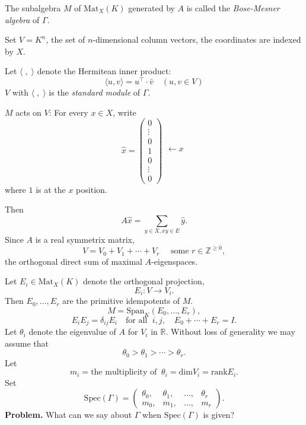 \documentclass[
]{book}
\theoremstyle{definition}
\theoremstyle{definition}
\theoremstyle{definition}
\theoremstyle{definition}
\theoremstyle{remark}
\begin{document}
The subalgebra \(M\) of \(\mathrm{Mat}_X(K)\) generated by \(A\) is called the \emph{Bose-Mesner algebra} of \(\Gamma\).

Set \(V = K^n\), the set of \(n\)-dimensional column vectors, the coordinates are indexed by \(X\).

Let \(\langle\; , \;\rangle\) denote the Hermitean inner product:
\[\langle u, v\rangle = u^\top\cdot \bar{v} \quad (u, v\in V)\]
\(V\) with \(\langle\; , \;\rangle\) is the \emph{standard module} of \(\Gamma\).

\(M\) acts on \(V\): For every \(x\in X\), write
\[\hat{x} = \begin{pmatrix} 0 \\ \vdots \\ 0 \\ 1 \\ 0 \\ \vdots \\ 0 \end{pmatrix}\begin{matrix}  \\  \\  \leftarrow x \\  \\  \\ \end{matrix}\]
where \(1\) is at the \(x\) position.

Then
\[A\hat{x} = \sum_{y\in X, xy\in E}\hat{y}.\]
Since \(A\) is a real symmetrix matrix,
\[V = V_0 + V_1 + \cdots + V_r \quad \textrm{ some } r\in \mathbb{Z}^{\geq0},\]
the orthogonal direct sum of maximal \(A\)-eigenspaces.

Let \(E_i\in\mathrm{Mat}_X(K)\) denote the orthogonal projection,
\[E_i: V \longrightarrow V_i.\]
Then \(E_0, \ldots, E_r\) are the primitive idempotents of \(M\).
\[M = \mathrm{Span}_K(E_0, \ldots, E_r),\]
\[E_iE_j = \delta_{ij}E_i \quad \textrm{for all }\; i, j, \quad E_0 + \cdots + E_r = I.\]
Let \(\theta_i\) denote the eigenvalue of \(A\) for \(V_i\) in \(\mathbb{R}\). Without loss of generality we may assume that
\[\theta_0 > \theta_1 > \cdots > \theta_r.\]
Let
\[m_i = \textrm{the multiplicity of }\: \theta_i = \mathrm{dim} V_i = \mathrm{rank} E_i.\]
Set
\[\mathrm{Spec}(\Gamma) = \begin{pmatrix} \theta_0, & \theta_1, & \ldots, & \theta_r\\m_0, & m_1, & \ldots, & m_r\end{pmatrix}.\]
\textbf{Problem. }
What can we say about \(\Gamma\) when \(\mathrm{Spec}(\Gamma)\) is given?
\end{document}
